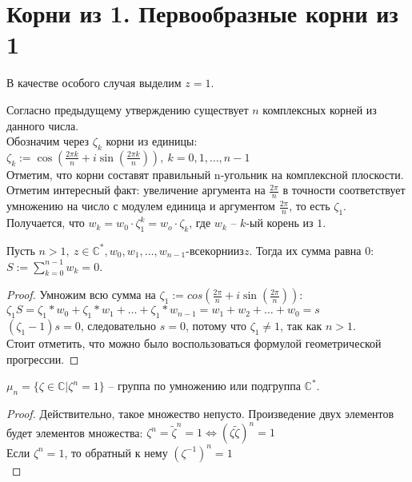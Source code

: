 \section{Корни из 1. Первообразные корни из 1}
\begin{normalsize}
  \begin{theorem-non}
    В качестве особого случая выделим $z=1$.
  \end{theorem-non}
  Согласно предыдущему утверждению существует $n$ комплексных корней из данного числа. \\

  Обозначим через $\zeta_k$ корни из единицы: \\ 

  $\zeta_k := \cos(\frac{2\pi k}{n} + i\sin(\frac{2\pi k}{n})),\ k=0, 1, \dots, n-1$ \\

  Отметим, что корни составят правильный n-угольник на комплексной плоскости. \\

  Отметим интересный факт: увеличение аргумента на $\frac{2\pi}{n}$ в точности соответствует умножению на число с модулем единица и аргументом $\frac{2\pi}{n}$, то есть $\zeta_1$. \\

  Получается, что $w_k = w_0\cdot\zeta_1^k = w_o\cdot\zeta_k$, где $w_k$ – $k$-ый корень из $1$.

  \begin{theorem-non}
    Пусть $n>1,\ z\in\mathbb{C}^*, w_0, w_1, \dots, w_{n-1}$-$все корни из z$. Тогда их сумма равна 0: $S:= \sum_{k=0}^{n-1}w_k = 0$. 
  \end{theorem-non}

  \begin{proof}
    Умножим всю сумма на $\zeta_1:=cos(\frac{2\pi}{n} + i\sin(\frac{2\pi}{n}))$: \\ 
    $\zeta_1S=\zeta_1*w_0 + \zeta_1*w_1 + \dots + \zeta_1*w_{n-1} = w_1 + w_2 + \dots + w_0=s$ \\
    $(\zeta_1-1)s = 0$, следовательно $s=0$, потому что $\zeta_1 \neq 1$, так как $n>1$. \\
    Стоит отметить, что можно было воспользоваться формулой геометрической прогрессии.
  \end{proof} 

  \begin{theorem-non}
    $\mu_n = \{ \zeta\in\mathbb{C} | \zeta^n = 1 \}$ – группа по умножению или подгруппа $\mathbb{C}^*$.
  \end{theorem-non}
  \begin{proof}
    Действительно, такое множество непусто. Произведение двух элементов будет элементов множества: 
    $\zeta^n = \tilde{\zeta}^n = 1 \Leftrightarrow (\zeta\tilde{\zeta})^n = 1$ \\
    Если $\zeta^n=1$, то обратный к нему $(\zeta^{-1})^n=1$ \\


\end{proof}
\end{normalsize}
